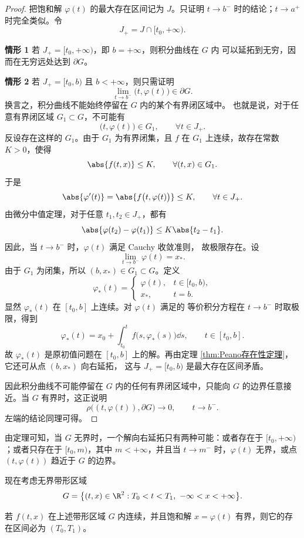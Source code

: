 \begin{proof}
	把饱和解 $\varphi(t)$ 的最大存在区间记为 $J$。只证明
	$t\to b^-$ 时的结论；$t\to a^+$ 时完全类似。令
	\[
		J_+=J\cap[t_0,+\infty).
	\]

	\noindent\textbf{情形 1}
	若 $J_+=[t_0,+\infty)$，即 $b=+\infty$，则积分曲线在 $G$ 内
	可以延拓到无穷，因而在无穷远处达到 $\partial G$。

	\noindent\textbf{情形 2}
	若 $J_+=[t_0,b)$ 且 $b<+\infty$，则只需证明
	\[
		\lim_{t\to b^-}\bigl(t,\varphi(t)\bigr)\in\partial G.
	\]
	换言之，积分曲线不能始终停留在 $G$ 内的某个有界闭区域中。
	也就是说，对于任意有界闭区域
	$G_1\subset G$，不可能有
	\[
		\bigl(t,\varphi(t)\bigr)\in G_1,
		\qquad \forall t\in J_+.
	\]
	反设存在这样的 $G_1$。由于 $G_1$ 为有界闭集，且 $f$ 在
	$G_1$ 上连续，故存在常数 $K>0$，使得
	\[
		\abs{f(t,x)}\leq K,
		\qquad \forall (t,x)\in G_1.
	\]
	于是
	\[
		\abs{\varphi'(t)}
		=\abs{f\bigl(t,\varphi(t)\bigr)}
		\leq K,
		\qquad \forall t\in J_+.
	\]
	由微分中值定理，对于任意 $t_1,t_2\in J_+$，都有
	\[
		\abs{\varphi(t_2)-\varphi(t_1)}
		\leq K\abs{t_2-t_1}.
	\]
	因此，当 $t\to b^-$ 时，$\varphi(t)$ 满足 Cauchy 收敛准则，
	故极限存在。设
	\[
		\lim_{t\to b^-}\varphi(t)=x_*.
	\]
	由于 $G_1$ 为闭集，所以 $(b,x_*)\in G_1\subset G$。定义
	\[
		\varphi_*(t)=
		\begin{cases}
			\varphi(t), & t\in[t_0,b),\\
			x_*, & t=b.
		\end{cases}
	\]
	显然 $\varphi_*(t)$ 在 $[t_0,b]$ 上连续。对 $\varphi(t)$ 满足的
	等价积分方程在 $t\to b^-$ 时取极限，得到
	\[
		\varphi_*(t)
		=x_0+\int_{t_0}^{t}
		f\bigl(s,\varphi_*(s)\bigr)\dd s,
		\qquad t\in[t_0,b].
	\]
	故 $\varphi_*(t)$ 是原初值问题在 $[t_0,b]$ 上的解。再由定理
	\ref{thm:Peano存在性定理}，它还可从点 $(b,x_*)$ 向右延拓，
	这与 $J_+=[t_0,b)$ 是最大存在区间矛盾。

	因此积分曲线不可能停留在 $G$ 内的任何有界闭区域中，只能向
	$G$ 的边界任意接近。当 $G$ 有界时，这正说明
	\[
		\rho\bigl((t,\varphi(t)),\partial G\bigr)\to0,
		\qquad t\to b^-.
	\]
	左端的结论同理可得。
\end{proof}

由定理可知，当 $G$ 无界时，一个解向右延拓只有两种可能：或者存在于
$[t_0,+\infty)$；或者只存在于 $[t_0,m)$，其中 $m<+\infty$，并且当
$t\to m^-$ 时，$\varphi(t)$ 无界，或点
$(t,\varphi(t))$ 趋近于 $G$ 的边界。

现在考虑无界带形区域
\[
	G=\bigl\{(t,x)\in\R^2:T_0<t<T_1,\ -\infty<x<+\infty\bigr\}.
\]

\begin{corollary}\label{cor:有界饱和解的全区间存在性}
	若 $f(t,x)$ 在上述带形区域 $G$ 内连续，并且饱和解
	$x=\varphi(t)$ 有界，则它的存在区间必为 $(T_0,T_1)$。
\end{corollary}

